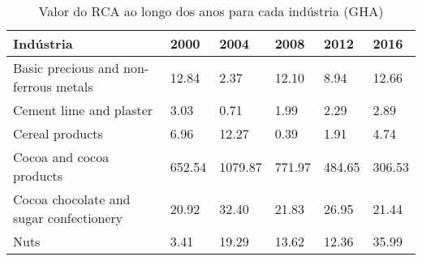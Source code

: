 \begin{table}
\centering
\caption{Valor do RCA ao longo dos anos para cada indústria (GHA)}
\label{tab:ex3-tempo-GHA}
\begin{tabular}{p{6cm}p{1.5cm}p{1.5cm}p{1.5cm}p{1.5cm}p{1.5cm}}
\toprule
                              Indústria &   2000 &    2004 &   2008 &   2012 &   2016 \\
\midrule
  Basic precious and non-ferrous metals &  12.84 &    2.37 &  12.10 &   8.94 &  12.66 \\
                Cement lime and plaster &   3.03 &    0.71 &   1.99 &   2.29 &   2.89 \\
                        Cereal products &   6.96 &   12.27 &   0.39 &   1.91 &   4.74 \\
               Cocoa and cocoa products & 652.54 & 1079.87 & 771.97 & 484.65 & 306.53 \\
Cocoa chocolate and sugar confectionery &  20.92 &   32.40 &  21.83 &  26.95 &  21.44 \\
                                   Nuts &   3.41 &   19.29 &  13.62 &  12.36 &  35.99 \\
\bottomrule
\end{tabular}
\end{table}
